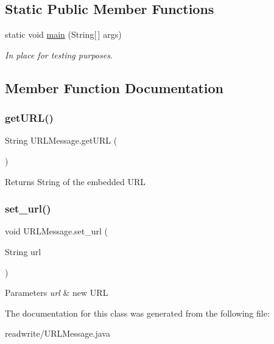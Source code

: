 \subsection*{Static Public Member Functions}
\begin{DoxyCompactItemize}
\item 
\mbox{\label{class_u_r_l_message_a2337e1bf5b85d8b18f0bd99fc68a5193}} 
static void \hyperlink{class_u_r_l_message_a2337e1bf5b85d8b18f0bd99fc68a5193}{main} (String\mbox{[}$\,$\mbox{]} args)
\begin{DoxyCompactList}\small\item\em In place for testing purposes. \end{DoxyCompactList}\end{DoxyCompactItemize}


\subsection{Member Function Documentation}
\mbox{\label{class_u_r_l_message_a9c2a3498360de3e3cc50cfe91b732f11}} 
\subsubsection{\texorpdfstring{get\+U\+R\+L()}{getURL()}}
{\footnotesize\ttfamily String U\+R\+L\+Message.\+get\+U\+RL (\begin{DoxyParamCaption}{ }\end{DoxyParamCaption})}

\begin{DoxyReturn}{Returns}
String of the embedded U\+RL 
\end{DoxyReturn}
\mbox{\label{class_u_r_l_message_a2056536ac32514f5f41ba8c6b4e4f66d}} 
\subsubsection{\texorpdfstring{set\+\_\+url()}{set\_url()}}
{\footnotesize\ttfamily void U\+R\+L\+Message.\+set\+\_\+url (\begin{DoxyParamCaption}\item[{String}]{url }\end{DoxyParamCaption})}


\begin{DoxyParams}{Parameters}
{\em url} & new U\+RL \\
\hline
\end{DoxyParams}


The documentation for this class was generated from the following file\+:\begin{DoxyCompactItemize}
\item 
readwrite/U\+R\+L\+Message.\+java\end{DoxyCompactItemize}
